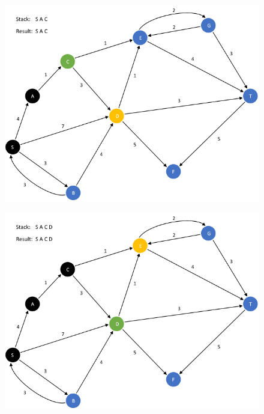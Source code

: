 \documentclass{article}
\begin{document}
\begin{enumerate}[leftmargin=\labelsep]
\begin{figure}[H]
\centering
\includegraphics[scale=0.6]{images/Q5/a/03.png}
\end{figure}

\begin{figure}[H]
\centering
\includegraphics[scale=0.6]{images/Q5/a/04.png}
\end{figure}


\end{enumerate}
\end{document}
